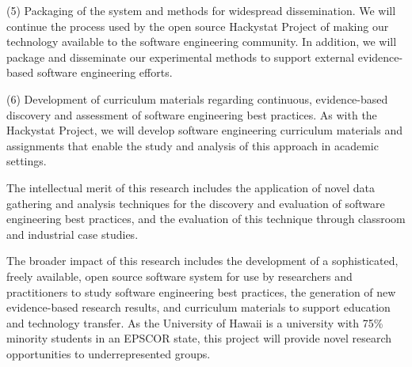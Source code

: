 \documentclass[11pt]{article}
\begin{document}
(5) Packaging of the system and methods for widespread dissemination.  We
will continue the process used by the open source Hackystat Project of making
our technology available to the software engineering community.  In addition, 
we will package and disseminate our experimental methods to support external
evidence-based software engineering efforts. 
  
(6) Development of curriculum materials regarding continuous,
  evidence-based discovery and assessment of software engineering best
  practices. As with the Hackystat Project, we will develop software engineering
  curriculum materials and assignments that enable the study and analysis
  of this approach in academic settings.

The intellectual merit of this research includes the application of novel
data gathering and analysis techniques for the discovery and evaluation of 
software engineering best practices, and the evaluation of this technique
through classroom and industrial case studies. 

The broader impact of this research includes the development of a
sophisticated, freely available, open source software system for use by
researchers and practitioners to study software engineering best practices,
the generation of new evidence-based research results, and curriculum
materials to support education and technology transfer.  As the University
of Hawaii is a university with 75\% minority students in an EPSCOR state,
this project will provide novel research opportunities to underrepresented
groups.
\end{document}
